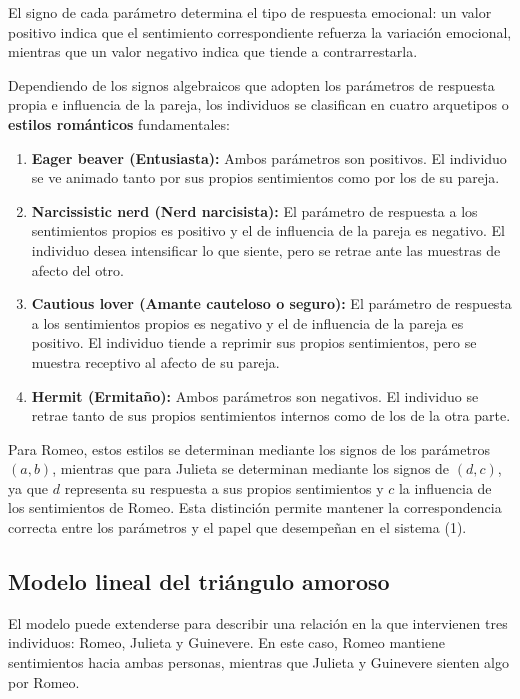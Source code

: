 \documentclass{article}
\begin{document}
El signo de cada parámetro determina el tipo de respuesta emocional: un valor positivo indica que el sentimiento correspondiente refuerza la variación emocional, mientras que un valor negativo indica que tiende a contrarrestarla.

Dependiendo de los signos algebraicos que adopten los parámetros de respuesta propia e influencia de la pareja, los individuos se clasifican en cuatro arquetipos o \textbf{estilos románticos} fundamentales:

\begin{enumerate}
    \item \textbf{Eager beaver (Entusiasta):} Ambos parámetros son positivos. El individuo se ve animado tanto por sus propios sentimientos como por los de su pareja.

    \item \textbf{Narcissistic nerd (Nerd narcisista):} El parámetro de respuesta a los sentimientos propios es positivo y el de influencia de la pareja es negativo. El individuo desea intensificar lo que siente, pero se retrae ante las muestras de afecto del otro.

    \item \textbf{Cautious lover (Amante cauteloso o seguro):} El parámetro de respuesta a los sentimientos propios es negativo y el de influencia de la pareja es positivo. El individuo tiende a reprimir sus propios sentimientos, pero se muestra receptivo al afecto de su pareja.

    \item \textbf{Hermit (Ermitaño):} Ambos parámetros son negativos. El individuo se retrae tanto de sus propios sentimientos internos como de los de la otra parte.
\end{enumerate}

Para Romeo, estos estilos se determinan mediante los signos de los parámetros $(a,b)$, mientras que para Julieta se determinan mediante los signos de $(d,c)$, ya que $d$ representa su respuesta a sus propios sentimientos y $c$ la influencia de los sentimientos de Romeo. Esta distinción permite mantener la correspondencia correcta entre los parámetros y el papel que desempeñan en el sistema (1).

\subsection{Modelo lineal del triángulo amoroso}

El modelo puede extenderse para describir una relación en la que intervienen tres individuos: Romeo, Julieta y Guinevere. En este caso, Romeo mantiene sentimientos hacia ambas personas, mientras que Julieta y Guinevere sienten algo por Romeo.
\end{document}
